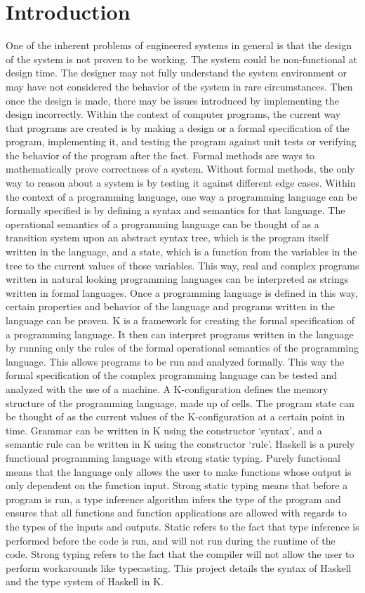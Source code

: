\chapter{Introduction}
One of the inherent problems of engineered systems in general is that the design of the system is not proven to be working. The system could be non-functional at design time. The designer may not fully understand the system environment or may have not considered the behavior of the system in rare circumstances. Then once the design is made, there may be issues introduced by implementing the design incorrectly.
Within the context of computer programs, the current way that programs are created is by making a design or a formal specification of the program, implementing it, and testing the program against unit tests or verifying the behavior of the program after the fact.
Formal methods are ways to mathematically prove correctness of a system. Without formal methods, the only way to reason about a system is by testing it against different edge cases.
Within the context of a programming language, one way a programming language can be formally specified is by defining a syntax and semantics for that language.
The operational semantics of a programming language can be thought of as a transition system upon an abstract syntax tree, which is the program itself written in the language, and a state, which is a function from the variables in the tree to the current values of those variables. 
This way, real and complex programs written in natural looking programming languages can be interpreted as strings written in formal languages. Once a programming language is defined in this way, certain properties and behavior of the language and programs written in the language can be proven.
K is a framework for creating the formal specification of a programming language. It then can interpret programs written in the language by running only the rules of the formal operational semantics of the programming language. This allows programs to be run and analyzed formally. This way the formal specification of the complex programming language can be tested and analyzed with the use of a machine.
A K-configuration defines the memory structure of the programming language, made up of cells. The program state can be thought of as the current values of the K-configuration at a certain point in time.
Grammar can be written in K using the constructor ‘syntax’, and a semantic rule can be written in K using the constructor ‘rule’.
Haskell is a purely functional programming language with strong static typing. Purely functional means that the language only allows the user to make functions whose output is only dependent on the function input. Strong static typing means that before a program is run, a type inference algorithm infers the type of the program and ensures that all functions and function applications are allowed with regards to the types of the inputs and outputs. Static refers to the fact that type inference is performed before the code is run, and will not run during the runtime of the code. Strong typing refers to the fact that the compiler will not allow the user to perform workarounds like typecasting.
This project details the syntax of Haskell and the type system of Haskell in K.